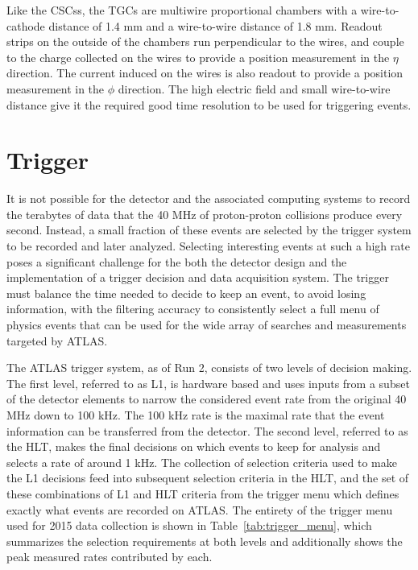 Like the \acp{CSC}s, the \acp{TGC} are multiwire proportional chambers with a wire-to-cathode distance of 1.4 mm and a wire-to-wire distance of 1.8 mm.
Readout strips on the outside of the chambers run perpendicular to the wires, and couple to the charge collected on the wires to provide a position measurement in the $\eta$ direction.
The current induced on the wires is also readout to provide a position measurement in the $\phi$ direction.
The high electric field and small wire-to-wire distance give it the required good time resolution to be used for triggering events. 


\section{Trigger}
\label{sec:trigger}

It is not possible for the detector and the associated computing systems to record the terabytes of data that the 40 MHz of proton-proton collisions produce every second.
Instead, a small fraction of these events are selected by the trigger system to be recorded and later analyzed.
Selecting interesting events at such a high rate poses a significant challenge for the both the detector design and the implementation of a trigger decision and data acquisition system.
The trigger must balance the time needed to decide to keep an event, to avoid losing information, with the filtering accuracy to consistently select a full menu of physics events that can be used for the wide array of searches and measurements targeted by \ac{ATLAS}. 

The \ac{ATLAS} trigger system, as of Run 2, consists of two levels of decision making. 
The first level, referred to as L1, is hardware based and uses inputs from a subset of the detector elements to narrow the considered event rate from the original 40 MHz down to 100 kHz.
The 100 kHz rate is the maximal rate that the event information can be transferred from the detector.
The second level, referred to as the \ac{HLT}, makes the final decisions on which events to keep for analysis and selects a rate of around 1 kHz.
The collection of selection criteria used to make the L1 decisions feed into subsequent selection criteria in the \ac{HLT}, and the set of these combinations of L1 and \ac{HLT} criteria from the trigger menu which defines exactly what events are recorded on \ac{ATLAS}.
The entirety of the trigger menu used for 2015 data collection is shown in Table~\ref{tab:trigger_menu}, which summarizes the selection requirements at both levels and additionally shows the peak measured rates contributed by each.

